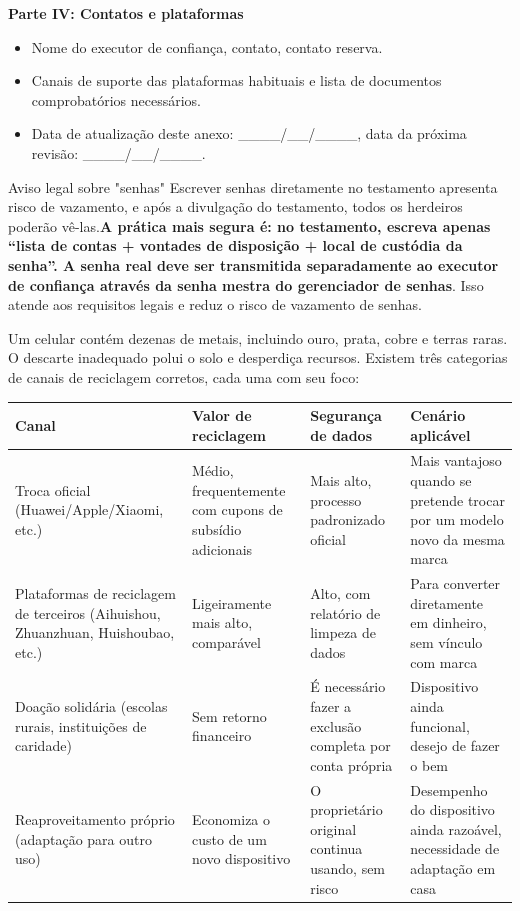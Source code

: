\textbf{Parte IV: Contatos e plataformas}

\begin{itemize}
  \item Nome do executor de confiança, contato, contato reserva.
  \item Canais de suporte das plataformas habituais e lista de documentos comprobatórios necessários.
  \item Data de atualização deste anexo: \_\_\_\_/\_\_/\_\_\_\_, data da próxima revisão: \_\_\_\_/\_\_/\_\_\_\_.
\end{itemize}

\begin{tcbwarn}{Aviso legal sobre "senhas"}
Escrever senhas diretamente no testamento apresenta risco de vazamento, e após a divulgação do testamento, todos os herdeiros poderão vê-las.\textbf{A prática mais segura é: no testamento, escreva apenas “lista de contas + vontades de disposição + local de custódia da senha”. A senha real deve ser transmitida separadamente ao executor de confiança através da senha mestra do gerenciador de senhas}. Isso atende aos requisitos legais e reduz o risco de vazamento de senhas.

\end{tcbwarn}


Um celular contém dezenas de metais, incluindo ouro, prata, cobre e terras raras. O descarte inadequado polui o solo e desperdiça recursos. Existem três categorias de canais de reciclagem corretos, cada uma com seu foco:

\begin{center}
\begin{tabularx}{\linewidth}{|X|X|X|X|}
\hline
\textbf{Canal} & \textbf{Valor de reciclagem} & \textbf{Segurança de dados} & \textbf{Cenário aplicável} \tabularnewline
\hline
Troca oficial (Huawei/Apple/Xiaomi, etc.) & Médio, frequentemente com cupons de subsídio adicionais & Mais alto, processo padronizado oficial & Mais vantajoso quando se pretende trocar por um modelo novo da mesma marca \tabularnewline
Plataformas de reciclagem de terceiros (Aihuishou, Zhuanzhuan, Huishoubao, etc.) & Ligeiramente mais alto, comparável & Alto, com relatório de limpeza de dados & Para converter diretamente em dinheiro, sem vínculo com marca \tabularnewline
Doação solidária (escolas rurais, instituições de caridade) & Sem retorno financeiro & É necessário fazer a exclusão completa por conta própria & Dispositivo ainda funcional, desejo de fazer o bem \tabularnewline
Reaproveitamento próprio (adaptação para outro uso) & Economiza o custo de um novo dispositivo & O proprietário original continua usando, sem risco & Desempenho do dispositivo ainda razoável, necessidade de adaptação em casa \tabularnewline
\hline
\end{tabularx}
\end{center}

